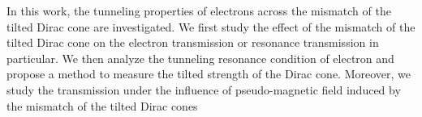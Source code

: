     In this work, the tunneling properties of electrons across the mismatch of the tilted Dirac cone are investigated. 
    We first study the effect of the mismatch of the tilted Dirac cone on the electron transmission or resonance transmission in particular. 
    We then analyze the tunneling resonance condition of electron and propose a method to measure the tilted strength of the Dirac cone. 
    Moreover, we study the transmission under the influence of pseudo-magnetic field induced by the mismatch of the tilted Dirac cones

    


